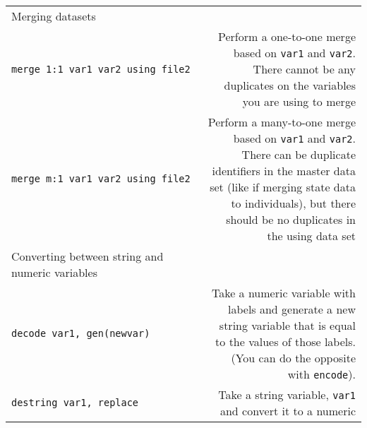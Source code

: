 \documentclass[
]{article}
\begin{document}
\begin{longtable}[]{@{}lr@{}}
\begin{minipage}[t]{0.53\columnwidth}\raggedright
Merging datasets\strut
\end{minipage} & \begin{minipage}[t]{0.41\columnwidth}\raggedleft
\strut
\end{minipage}\tabularnewline
\begin{minipage}[t]{0.53\columnwidth}\raggedright
\texttt{merge\ 1:1\ var1\ var2\ using\ file2}\strut
\end{minipage} & \begin{minipage}[t]{0.41\columnwidth}\raggedleft
Perform a one-to-one merge based on \texttt{var1} and \texttt{var2}.
There cannot be any duplicates on the variables you are using to
merge\strut
\end{minipage}\tabularnewline
\begin{minipage}[t]{0.53\columnwidth}\raggedright
\texttt{merge\ m:1\ var1\ var2\ using\ file2}\strut
\end{minipage} & \begin{minipage}[t]{0.41\columnwidth}\raggedleft
Perform a many-to-one merge based on \texttt{var1} and \texttt{var2}.
There can be duplicate identifiers in the master data set (like if
merging state data to individuals), but there should be no duplicates in
the using data set\strut
\end{minipage}\tabularnewline
\begin{minipage}[t]{0.53\columnwidth}\raggedright
Converting between string and numeric variables\strut
\end{minipage} & \begin{minipage}[t]{0.41\columnwidth}\raggedleft
\strut
\end{minipage}\tabularnewline
\begin{minipage}[t]{0.53\columnwidth}\raggedright
\texttt{decode\ var1,\ gen(newvar)}\strut
\end{minipage} & \begin{minipage}[t]{0.41\columnwidth}\raggedleft
Take a numeric variable with labels and generate a new string variable
that is equal to the values of those labels. (You can do the opposite
with \texttt{encode}).\strut
\end{minipage}\tabularnewline
\begin{minipage}[t]{0.53\columnwidth}\raggedright
\texttt{destring\ var1,\ replace}\strut
\end{minipage} & \begin{minipage}[t]{0.41\columnwidth}\raggedleft
Take a string variable, \texttt{var1} and convert it to a numeric

\end{minipage}
\end{longtable}
\end{document}
